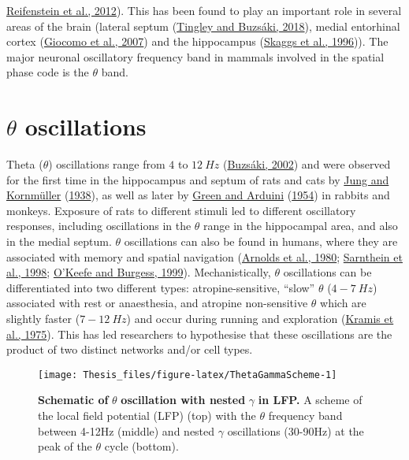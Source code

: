 \documentclass[
  12pt,
  a4paper,
  openany]{book}
\begin{document}
\protect\hyperlink{ref-reifenstein_grid_2012}{Reifenstein et al., 2012}). This has been found to play an important role in several areas of the brain (lateral septum (\protect\hyperlink{ref-tingley_transformation_2018}{Tingley and Buzsáki, 2018}), medial entorhinal cortex (\protect\hyperlink{ref-giocomo_temporal_2007}{Giocomo et al., 2007}) and the hippocampus (\protect\hyperlink{ref-skaggs_theta_1996}{Skaggs et al., 1996})). The major neuronal oscillatory frequency band in mammals involved in the spatial phase code is the \(\theta\) band.

\hypertarget{theta-oscillations}{%
\section{\texorpdfstring{\(\theta\) oscillations}{\textbackslash theta oscillations}}\label{theta-oscillations}}

Theta (\(\theta\)) oscillations range from \(4\) to \(12\ Hz\) (\protect\hyperlink{ref-buzsaki_theta_2002}{Buzsáki, 2002}) and were observed for the first time in the hippocampus and septum of rats and cats by \protect\hyperlink{ref-jung_method_1938}{Jung and Kornmüller} (\protect\hyperlink{ref-jung_method_1938}{1938}), as well as later by \protect\hyperlink{ref-green_hippocampal_1954}{Green and Arduini} (\protect\hyperlink{ref-green_hippocampal_1954}{1954}) in rabbits and monkeys. Exposure of rats to different stimuli led to different oscillatory responses, including oscillations in the \(\theta\) range in the hippocampal area, and also in the medial septum. \(\theta\) oscillations can also be found in humans, where they are associated with memory and spatial navigation (\protect\hyperlink{ref-arnolds_spectral_1980}{Arnolds et al., 1980}; \protect\hyperlink{ref-sarnthein_synchronization_1998}{Sarnthein et al., 1998}; \protect\hyperlink{ref-okeefe_theta_1999}{O'Keefe and Burgess, 1999}). Mechanistically, \(\theta\) oscillations can be differentiated into two different types: atropine-sensitive, ``slow'' \(\theta\) (\(4-7\ Hz\)) associated with rest or anaesthesia, and atropine non-sensitive \(\theta\) which are slightly faster (\(7-12\ Hz\)) and occur during running and exploration (\protect\hyperlink{ref-kramis_two_1975}{Kramis et al., 1975}). This has led researchers to hypothesise that these oscillations are the product of two distinct networks and/or cell types.




\begin{figure}[h]
\texttt{[image: Thesis\_files/figure-latex/ThetaGammaScheme-1]} \caption[Schematic of \(\theta\) oscillation with nested \(\gamma\) in LFP]{\textbf{Schematic of} \(\theta\) \textbf{oscillation with nested} \(\gamma\) \textbf{in LFP.} A scheme of the local field potential (LFP) (top) with the \(\theta\) frequency band between 4-12Hz (middle) and nested \(\gamma\) oscillations (30-90Hz) at the peak of the \(\theta\) cycle (bottom).}\label{fig:ThetaGammaScheme}
\end{figure}
\end{document}
